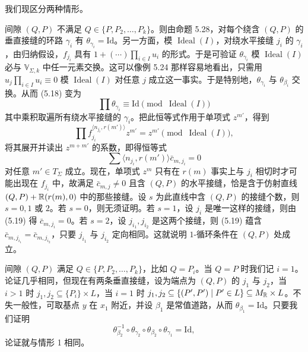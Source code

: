 
我们现区分两种情形。

 间隙 $(Q,P)$ 不满足 $Q\in\{P,P_2,\ldots,P_k\}$。则由命题 5.28，对每个绕含 $(Q,P)$ 的垂直接缝的环路 $\gamma_i$ 有 $\theta_{\gamma_i}=\mathrm{Id}$。另一方面，模 $\operatorname{Ideal}(I)$，对绕水平接缝 $j_i$ 的 $\gamma_i$，由归纳假设，$f_{j_i}$ 具有 $1+(\cdots)\prod_{i\in I}u_i$ 的形式。于是可验证 $\theta_{\gamma_i}$ 模 $\operatorname{Ideal}(I)$ 必与 $\mathbb{V}_{\Sigma,k}$ 中任一元素交换。这可以像例 5.24 那样容易地看出，只需用 $u_j\prod_{i\in I}u_i\equiv 0$
模 $\operatorname{Ideal}(I)$ 对任意 $j$ 成立这一事实。于是特别地，$\theta_{\gamma_i}$ 与 $\theta_{\beta_i}$ 交换。从而 (5.18) 变为
\[
  \prod\theta_{\gamma_i}\equiv\mathrm{Id}\pmod{\operatorname{Ideal}(I)}
\]
其中乘积取遍所有绕水平接缝的 $\gamma_i$。把此恒等式作用于单项式 $z^{m'}$，得到
\[
  \prod f_{j_i}^{\langle n_{j_i},r(m')\rangle}z^{m'}=z^{m'}\pmod{\operatorname{Ideal}(I)},
\]
将其展开并读出 $z^{m+m'}$ 的系数，即得恒等式
\begin{equation}
  \sum\langle n_{j_i},r(m')\rangle\bar c_{m,j_i}=0 \tag{5.19}
\end{equation}
对任意 $m'\in T_\Sigma$ 成立。现在，单项式 $z^m$ 只有在 $r(m)$ 事实上与 $j_i$ 相切时才可能出现在 $f_{j_i}$ 中，故满足 $\bar c_{m,j}\ne 0$ 且含 $(Q,P)$ 的水平接缝，恰是含于仿射直线 $(Q,P)+\mathbb{R}(r(m),0)$ 中的那些接缝。设 $s$ 为此直线中含 $(Q,P)$ 的接缝个数，则 $s=0,1$ 或 $2$。若 $s=0$，则无须证明。若 $s=1$，设 $j_i$ 是唯一这样的接缝，则由 (5.19) 得 $\bar c_{m,j_i}=0$。若 $s=2$，设 $j_{i_1},j_{i_2}$ 是这两个接缝，则 (5.19) 蕴含 $\bar c_{m,j_{i_1}}=\bar c_{m,j_{i_2}}$，只要 $j_{i_1}$ 与 $j_{i_2}$ 定向相同。这就说明 $1$-循环条件在 $(Q,P)$ 处成立。

 间隙 $(Q,P)$ 满足 $Q\in\{P,P_2,\ldots,P_k\}$，比如 $Q=P_i$。当 $Q=P$ 时我们记 $i=1$。论证几乎相同，但现在有两条垂直接缝，设为端点为 $(Q,P)$ 的 $j_1$ 与 $j_2$，当 $i>1$ 时 $j_1,j_2\subseteq\{P_i\}\times L$，当 $i=1$ 时 $j_1,j_2\subseteq\{(P',P')\mid P'\in L\}\subseteq M_{\mathbb{R}}\times L$。不失一般性，可取基点 $y$ 在 $x_1$ 附近，并设 $\beta_1$ 是常值道路，从而 $\theta_{\beta_1}=\mathrm{Id}$。只要我们证明
\begin{equation}
  \theta_{\beta_2}^{-1}\circ\theta_{\gamma_2}\circ\theta_{\beta_2}\circ\theta_{\gamma_1}=\mathrm{Id}, \tag{5.20}
\end{equation}
论证就与情形 1 相同。

